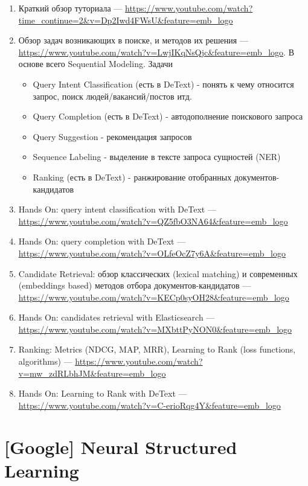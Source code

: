 \begin{enumerate}
    \item Краткий обзор туториала --- \url{https://www.youtube.com/watch?time_continue=2&v=Dp2Iwd4FWsU&feature=emb_logo}
    \item Обзор задач возникающих в поиске, и методов их решения --- \url{https://www.youtube.com/watch?v=LwjIKqNsQjc&feature=emb_logo}. В основе всего Sequential Modeling. 
    Задачи
        \begin{itemize}
            \item Query Intent Classification (есть в DeText) - понять к чему относится запрос, поиск людей/вакансий/постов итд.
            \item Query Completion (есть в DeText) - автодополнение поискового запроса
            \item Query Suggestion - рекомендация запросов
            \item Sequence Labeling - выделение в тексте запроса сущностей (NER)
            \item Ranking (есть в DeText) - ранжирование отобранных документов-кандидатов
        \end{itemize}
    \item Hands On: query intent classification with DeText --- \url{https://www.youtube.com/watch?v=QZ5fbO3NA64&feature=emb_logo}
    \item Hands On: query completion with DeText --- \url{https://www.youtube.com/watch?v=OLfeOcZ7y6A&feature=emb_logo}
    \item Candidate Retrieval: обзор классических (lexical matching) и современных (embeddings based) методов отбора документов-кандидатов --- \url{https://www.youtube.com/watch?v=KECp0syOH28&feature=emb_logo}
    \item Hands On: candidates retrieval with Elasticsearch --- \url{https://www.youtube.com/watch?v=MXbttPyNON0&feature=emb_logo}
    \item Ranking: Metrics (NDCG, MAP, MRR), Learning to Rank (loss functions, algorithms) --- \url{https://www.youtube.com/watch?v=mw_zdRLbhJM&feature=emb_logo}
    \item Hands On: Learning to Rank with DeText --- \url{https://www.youtube.com/watch?v=C-erioRqg4Y&feature=emb_logo}
\end{enumerate}


\newpage
\section*{[Google] Neural Structured Learning} 

